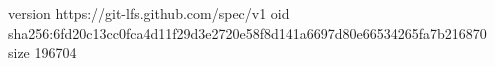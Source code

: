 version https://git-lfs.github.com/spec/v1
oid sha256:6fd20c13cc0fca4d11f29d3e2720e58f8d141a6697d80e66534265fa7b216870
size 196704
